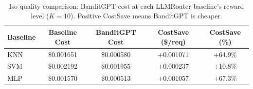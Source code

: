 \begin{table}[htbp]
\centering
\caption{Iso-quality comparison: BanditGPT cost at each LLMRouter baseline's reward level ($K{=}10$). Positive CostSave means BanditGPT is cheaper.}
\label{tab:isoquality_k10}
\small
\begin{tabular}{lcccc}
\toprule
Baseline & Baseline Cost & BanditGPT Cost & CostSave (\$/req) & CostSave (\%) \\
\midrule
KNN & \$0.001651 & \$0.000580 & +0.001071 & +64.9\% \\
SVM & \$0.002192 & \$0.001955 & +0.000237 & +10.8\% \\
MLP & \$0.001570 & \$0.000513 & +0.001057 & +67.3\% \\
\bottomrule
\end{tabular}
\end{table}
